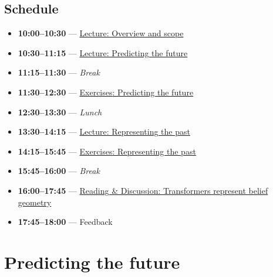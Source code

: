 \documentclass[11pt]{article}
\begin{document}
\subsection{Schedule}\label{schedule}

\begin{itemize}
\item
  \textbf{10:00--10:30} --- \href{https://iliad-intensive.org/downloads/computational-mechanics/computational-mechanics-slides.pdf}{Lecture: Overview and scope}
\item
  \textbf{10:30--11:15} --- \href{https://iliad-intensive.org/downloads/computational-mechanics/computational-mechanics-slides-2-predicting-the-future.pdf}{Lecture: Predicting the future}
\item
  \textbf{11:15--11:30} --- \emph{Break}
\item
  \textbf{11:30--12:30} --- \hyperref[sec:predicting-the-future]{{Exercises}: Predicting the future}
\item
  \textbf{12:30--13:30} --- \emph{Lunch}
\item
  \textbf{13:30--14:15} --- \href{https://iliad-intensive.org/downloads/computational-mechanics/computational-mechanics-slides-3-representing-the-past.pdf}{Lecture: Representing the past}
\item
  \textbf{14:15--15:45} --- \hyperref[sec:representing-the-past]{{Exercises}: Representing the past}
\item
  \textbf{15:45--16:00} --- \emph{Break}
\item
  \textbf{16:00--17:45} --- \hyperref[sec:belief-geometry]{Reading \& Discussion: Transformers represent belief geometry}
\item
  \textbf{17:45--18:00} --- Feedback
\end{itemize}

\section{Predicting the future}\label{sec:predicting-the-future}

\end{document}
